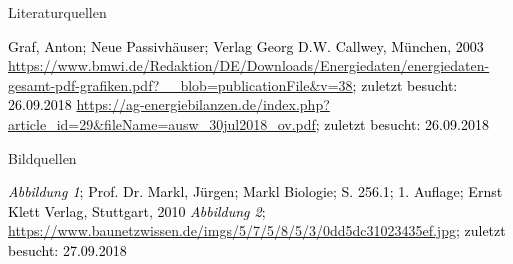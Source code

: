 \documentclass[11pt]{beamer}
\begin{document}
\begin{frame}{Literaturquellen}
\begin{thebibliography}{9}
\textcolor{black}{
Graf, Anton; Neue Passivhäuser; Verlag Georg D.W. Callwey, München, 2003}
\textcolor{black}{\url{https://www.bmwi.de/Redaktion/DE/Downloads/Energiedaten/energiedaten-gesamt-pdf-grafiken.pdf?__blob=publicationFile&v=38}; zuletzt besucht: 26.09.2018}
\textcolor{black}{
\url{https://ag-energiebilanzen.de/index.php?article_id=29&fileName=ausw_30jul2018_ov.pdf}; zuletzt besucht: 26.09.2018}
\end{thebibliography}
\end{frame}

\begin{frame}{Bildquellen}
\begin{thebibliography}{9}
\textcolor{black}{
\textit{Abbildung 1}; Prof. Dr. Markl, Jürgen; Markl Biologie; S. 256.1; 1. Auflage; Ernst Klett Verlag, Stuttgart, 2010}
\textcolor{black}{
\textit{Abbildung 2}; \url{https://www.baunetzwissen.de/imgs/5/7/5/8/5/3/0dd5dc31023435ef.jpg}; zuletzt besucht: 27.09.2018}
\end{thebibliography}
\end{frame}
\end{document}
